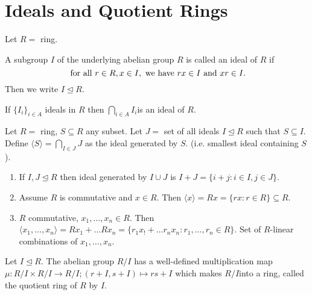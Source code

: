 \section{Ideals and Quotient Rings}

Let \(R = \) ring.

\begin{definition}[Ideals]
    A subgroup \(I\) of the underlying abelian group \(R\) is called an ideal of \(R\) if
    \[\text{ for all } r \in R, x \in I, \text{ we have } rx \in I \text{ and } xr \in I.\]
    Then we write \(I \trianglelefteq R\).
\end{definition}


\begin{lemma}
    If \(\{I_i\}_{i \in A}\) ideals in \(R\) then \(\bigcap_{i \in A} I_i\)is an ideal of \(R\).
\end{lemma}

\begin{corollary}
    Let \(R = \) ring, \(S \subseteq R\) any subset. Let \(J = \) set of all ideals \(I \trianglelefteq R\) such that \(S \subseteq I\). Define \(\langle S \rangle = \bigcap_{I \in J} J\) as the ideal generated by \(S\). (i.e. smallest ideal containing \(S\)).
\end{corollary}

\begin{proposition}
    \begin{enumerate}
        \item If \(I, J \trianglelefteq R\) then ideal generated by \(I \cup J\) is \(I + J = \{i + j: i \in I, j \in J\}\).
        \item Assume \(R\) is commutative and \(x \in R\). Then \(\langle x \rangle = Rx = \{rx : r \in R\} \subseteq R\).
        \item \(R\) commutative, \(x_1, \dots, x_n \in R\). Then \(\langle x_1, \dots, x_n \rangle = Rx_1 + \dots Rx_n = \{r_1x_! + \dots r_nx_n : r_1, \dots, r_n \in R\}\). Set of \(R\)-linear combinations of \(x_1, \dots, x_n\).
    \end{enumerate}
\end{proposition}

\begin{prop-defn}
Let \(I \trianglelefteq R\). The abelian group \(R / I\) has a well-defined multiplication map \(\mu: R / I \times R / I \to R / I; (r + I, s + I) \mapsto rs + I\) which makes \(R / I\)into a ring, called the quotient ring of \(R\) by \(I\).
\end{prop-defn}

